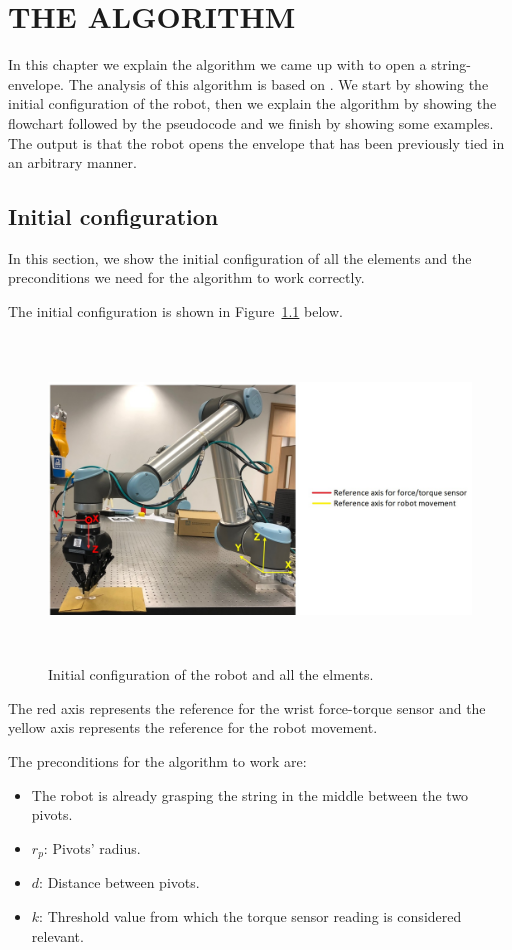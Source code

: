 \chapter{THE ALGORITHM}
\label{ch:Algorithm}
In this chapter we explain the algorithm we came up with to open a string-envelope. The analysis of this algorithm is based on \cite{cormen2009introduction}. We start by showing the initial configuration of the robot, then we explain the algorithm by showing the flowchart followed by the pseudocode and we finish by showing some examples. The output is that the robot opens the envelope that has been previously tied in an arbitrary manner. 

\section{Initial configuration}
In this section, we show the initial configuration of all the elements and the preconditions we need for the algorithm to work correctly.

The initial configuration is shown in Figure~\ref{fig:configuration} below.
\begin{figure}[h!]
	\centering
	\includegraphics[height=86mm]{chapters/figures/algorithm/configuration.jpg}
	\caption{Initial configuration of the robot and all the elments.}
	\label{fig:configuration}
\end{figure}

The red axis represents the reference for the wrist force-torque sensor and the yellow axis represents the reference for the robot movement.

The preconditions for the algorithm to work are:
\begin{itemize}
 \item The robot is already grasping the string in the middle between the two pivots.
 \item $r_{p}$: Pivots' radius.
 \item $d$: Distance between pivots.
 \item $k$: Threshold value from which the torque sensor reading is considered relevant.
\end{itemize}

